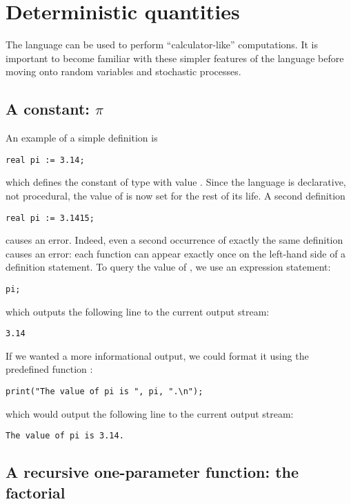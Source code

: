 \section{Deterministic quantities}

The {\smart} language can be used to perform ``calculator-like'' computations.
It is important to become familiar with these simpler features of
the language before moving onto random variables and stochastic processes.

\subsection{A constant: $\pi$}

An example of a simple definition is
\begin{lstlisting}
real pi := 3.14;
\end{lstlisting}
which defines the constant  of type  with value
.  Since the {\smart} language is declarative, not procedural,
the value of  is now set for the rest of its life.  A second
definition
\begin{lstlisting}
real pi := 3.1415;
\end{lstlisting}
causes an error.  Indeed, even a second occurrence of exactly the same
definition causes an error: each function can appear exactly once on
the left-hand side of a definition statement.
To query the value of , we use an expression statement:
\begin{lstlisting}
pi;
\end{lstlisting}
which outputs the following line to the current output stream:
\lstset{language=output}
\begin{lstlisting}
3.14
\end{lstlisting}
\lstset{language=smart}
If we wanted a more informational output, we could format it
using the predefined function :
\begin{lstlisting}
print("The value of pi is ", pi, ".\n");
\end{lstlisting}
which would output the following line to the current output stream:
\lstset{language=output}
\begin{lstlisting}
The value of pi is 3.14.
\end{lstlisting}
\lstset{language=smart}






\subsection{A recursive one-parameter function: the factorial}
\label{SEC:factorial}

